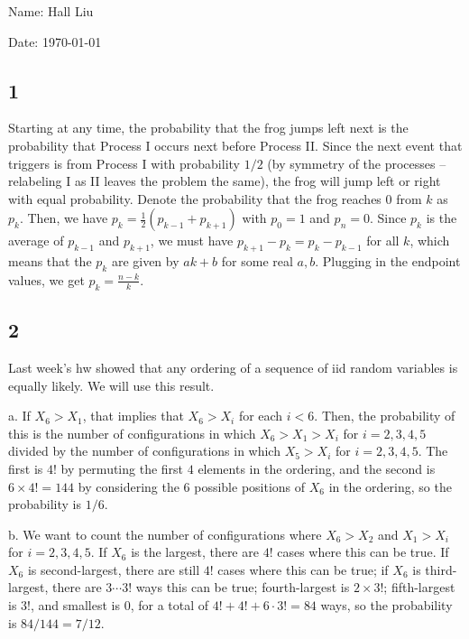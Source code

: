 \documentclass{article}
\begin{document}
Name: Hall Liu

Date: \today 
\vspace{1.5cm}

\subsection*{1}
Starting at any time, the probability that the frog jumps left next is the probability that Process I occurs next before Process II. Since the next event that triggers is from Process I with probability $1/2$ (by symmetry of the processes -- relabeling I as II leaves the problem the same), the frog will jump left or right with equal probability. Denote the probability that the frog reaches $0$ from $k$ as $p_k$. Then, we have $p_k=\frac{1}{2}(p_{k-1}+p_{k+1})$ with $p_0=1$ and $p_n=0$. Since $p_k$ is the average of $p_{k-1}$ and $p_{k+1}$, we must have $p_{k+1}-p_k=p_k-p_{k-1}$ for all $k$, which means that the $p_k$ are given by $ak+b$ for some real $a,b$. Plugging in the endpoint values, we get $p_k=\frac{n-k}{k}$.
\subsection*{2}
Last week's hw showed that any ordering of a sequence of iid random variables is equally likely. We will use this result.

a. If $X_6>X_1$, that implies that $X_6>X_i$ for each $i<6$. Then, the probability of this is the number of configurations in which $X_6>X_1>X_i$ for $i=2,3,4,5$ divided by the number of configurations in which $X_5>X_i$ for $i=2,3,4,5$. The first is $4!$ by permuting the first $4$ elements in the ordering, and the second is $6\times4!=144$ by considering the $6$ possible positions of $X_6$ in the ordering, so the probability is $1/6$.

b. We want to count the number of configurations where $X_6>X_2$ and $X_1>X_i$ for $i=2,3,4,5$. If $X_6$ is the largest, there are $4!$ cases where this can be true. If $X_6$ is second-largest, there are still $4!$ cases where this can be true; if $X_6$ is third-largest, there are $3\cdots3!$ ways this can be true; fourth-largest is $2\times3!$; fifth-largest is $3!$, and smallest is $0$, for a total of $4!+4!+6\cdot3!=84$ ways, so the probability is $84/144=7/12$.
\end{document}
